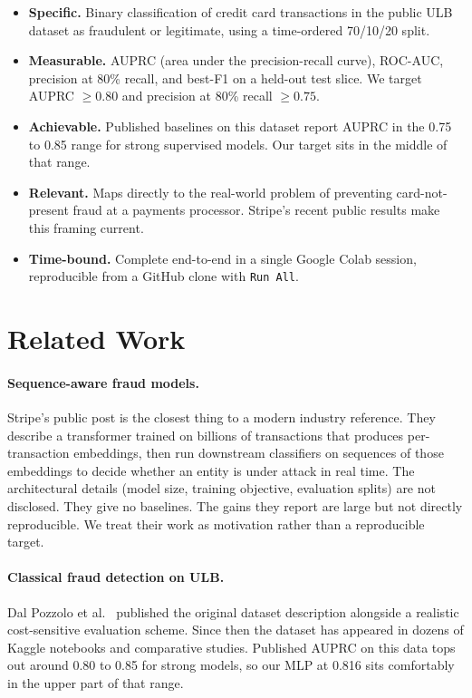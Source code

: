 \documentclass{article}
\begin{document}
\begin{itemize}
\item \textbf{Specific.} Binary classification of credit card transactions in the public ULB dataset as fraudulent or legitimate, using a time-ordered 70/10/20 split.
\item \textbf{Measurable.} AUPRC (area under the precision-recall curve), ROC-AUC, precision at 80\% recall, and best-F1 on a held-out test slice. We target AUPRC $\geq 0.80$ and precision at 80\% recall $\geq 0.75$.
\item \textbf{Achievable.} Published baselines on this dataset report AUPRC in the 0.75 to 0.85 range for strong supervised models. Our target sits in the middle of that range.
\item \textbf{Relevant.} Maps directly to the real-world problem of preventing card-not-present fraud at a payments processor. Stripe's recent public results \cite{stripeflywheel2024} make this framing current.
\item \textbf{Time-bound.} Complete end-to-end in a single Google Colab session, reproducible from a GitHub clone with \texttt{Run All}.
\end{itemize}

\section{Related Work}

\paragraph{Sequence-aware fraud models.} Stripe's public post \cite{stripeflywheel2024} is the closest thing to a modern industry reference. They describe a transformer trained on billions of transactions that produces per-transaction embeddings, then run downstream classifiers on sequences of those embeddings to decide whether an entity is under attack in real time. The architectural details (model size, training objective, evaluation splits) are not disclosed. They give no baselines. The gains they report are large but not directly reproducible. We treat their work as motivation rather than a reproducible target.

\paragraph{Classical fraud detection on ULB.} Dal Pozzolo et al.~\cite{dalpozzolo2018} published the original dataset description alongside a realistic cost-sensitive evaluation scheme. Since then the dataset has appeared in dozens of Kaggle notebooks and comparative studies. Published AUPRC on this data tops out around 0.80 to 0.85 for strong models, so our MLP at 0.816 sits comfortably in the upper part of that range.
\end{document}
